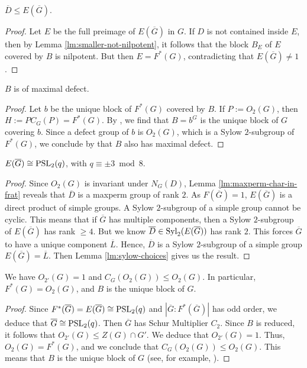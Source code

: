 \documentclass[bysection, amsart]{standard}
\begin{document}
\begin{lemma}
    $\overline{D} \leq E(\overline{G})$.
\end{lemma}
\begin{proof}
    Let $E$ be the full preimage of $E(\overline{G})$ in $G$. If $D$ is not contained inside $E$, then by Lemma \ref{lm:smaller-not-nilpotent}, it follows that the block $B_E$ of $E$ covered by $B$ is nilpotent. But then $E = F^*(G)$, contradicting that $E(\overline{G}) \neq 1$.
\end{proof}

\begin{lemma}
    $B$ is of maximal defect.
\end{lemma}
\begin{proof}
    Let $b$ be the unique block of $F^*(G)$ covered by $B$. If $P := O_2(G)$, then $H := PC_G(P) = F^*(G)$. By \cite[Corollary 9.21]{book:navarro}, we find that $B = b^G$ is the unique block of $G$ covering $b$. Since a defect group of $b$ is $O_2(G)$, which is a Sylow $2$-subgroup of $F^*(G)$, we conclude by \cite[Theorem 9.17]{book:navarro} that $B$ also has maximal defect.
\end{proof}

\begin{lemma}
    $E(\overline{G}) \cong \operatorname{PSL}_2(q)$, with $q \equiv \pm 3 \bmod{8}$.
\end{lemma}
\begin{proof}
    Since $O_2(G)$ is invariant under $N_G(D)$, Lemma \ref{lm:maxperm-char-in-frat} reveals that $\overline{D}$ is a maxperm group of rank $2$. As $F(\overline{G}) = 1$, $E(\overline{G})$ is a direct product of simple groups. A Sylow $2$-subgroup of a simple group cannot be cyclic. This means that if $\overline{G}$ has multiple components, then a Sylow $2$-subgroup of $E(\overline{G})$ has rank $\geq 4$. But we know $\overline{D} \in \operatorname{Syl}_2(E(\overline{G}))$ has rank $2$. This forces $\overline{G}$ to have a unique component $\overline{L}$. Hence, $\overline{D}$ is a Sylow $2$-subgroup of a simple group $E(\overline{G}) = \overline{L}$. Then Lemma \ref{lm:sylow-choices} gives us the result.
\end{proof}

\begin{lemma} \label{lm:unique-block}
    We have $O_{2'}(G) = 1$ and $C_G(O_2(G)) \leq O_2(G)$. In particular, $F^*(G) = O_2(G)$, and $B$ is the unique block of $G$.
\end{lemma}
\begin{proof}
    Since $F^*(\overline{G}) = E(\overline{G}) \cong \operatorname{PSL}_2(q)$ and $|\overline{G} : F^*(\overline{G})|$ has odd order, we deduce that $\overline{G} \cong \operatorname{PSL}_2(q)$. Then $\overline{G}$ has Schur Multiplier $C_2$. Since $B$ is reduced, it follows that $O_{2'}(G) \leq Z(G) \cap G'$. We deduce that $O_{2'}(G) = 1$. Thus, $O_2(G) = F^*(G)$, and we conclude that $C_G(O_2(G)) \leq O_2(G)$. This means that $B$ is the unique block of $G$ (see, for example, \cite[Theorem 4.14]{book:navarro}).
\end{proof}
\end{document}
